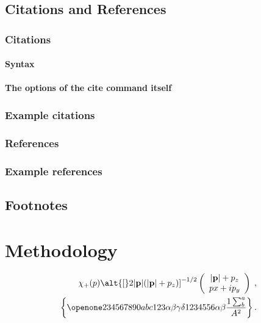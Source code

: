 \documentclass[%
 reprint,
 amsmath,amssymb,
 aps,
 floatfix,
]{revtex4-2}
\begin{document}
\subsection{\label{sec:citeref}Citations and References}


\subsubsection{Citations}


\paragraph{Syntax}


\paragraph{The options of the cite command itself}


\subsubsection{Example citations}


\subsubsection{References}


\subsubsection{Example references}




\subsection{Footnotes}%

\section{Methodology}


\begin{eqnarray}
\chi_+(p)\alt{\bf [}2|{\bf p}|(|{\bf p}|+p_z){\bf ]}^{-1/2}
\left(
\begin{array}{c}
|{\bf p}|+p_z\\
px+ip_y
\end{array}\right)\;,
\\
\left\{%
 \openone234567890abc123\alpha\beta\gamma\delta1234556\alpha\beta
 \frac{1\sum^{a}_{b}}{A^2}%
\right\}%
\label{eq:one}.
\end{eqnarray}
\end{document}
